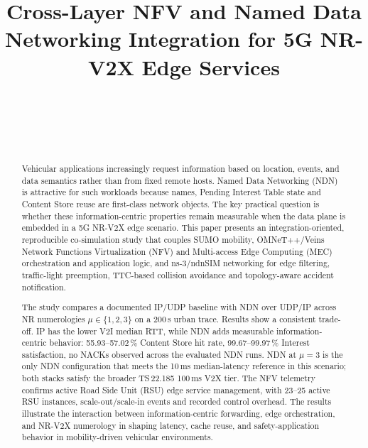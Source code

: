 \documentclass[journal]{IEEEtran}
\begin{document}
\title{Cross-Layer NFV and Named Data Networking Integration for 5G NR-V2X Edge Services}
\author{
\\
 \\
\and
{}\\
}
\maketitle

\begin{abstract}
Vehicular applications increasingly request information based on location, events, and data semantics rather than from fixed remote hosts. Named Data Networking (NDN) is attractive for such workloads because names, Pending Interest Table state and Content Store reuse are first-class network objects. The key practical question is whether these information-centric properties remain measurable when the data plane is embedded in a 5G NR-V2X edge scenario. This paper presents an integration-oriented, reproducible co-simulation study that couples SUMO mobility, OMNeT++/Veins Network Functions Virtualization (NFV) and Multi-access Edge Computing (MEC) orchestration and application logic, and ns-3/ndnSIM networking for edge filtering, traffic-light preemption, TTC-based collision avoidance and topology-aware accident notification.

The study compares a documented IP/UDP baseline with NDN over UDP/IP
across NR numerologies $\mu\in\{1,2,3\}$ on a 200\,s urban trace. Results show a consistent trade-off. IP has the lower V2I
median RTT, while NDN adds measurable information-centric behavior:
55.93--57.02\,\% Content Store hit rate, 99.67--99.97\,\% Interest
satisfaction, no NACKs observed across the evaluated NDN runs. NDN at $\mu=3$
is the only NDN configuration that meets the 10\,ms median-latency reference in this scenario; both stacks satisfy the broader
TS\,22.185 100\,ms V2X tier. The NFV telemetry confirms active Road Side Unit (RSU) edge
service management, with 23--25 active RSU instances, scale-out/scale-in
events and recorded control overhead. The results illustrate the interaction between information-centric forwarding, edge orchestration, and NR-V2X numerology in shaping latency, cache reuse, and safety-application behavior in mobility-driven vehicular environments.
\end{abstract}
\end{document}
